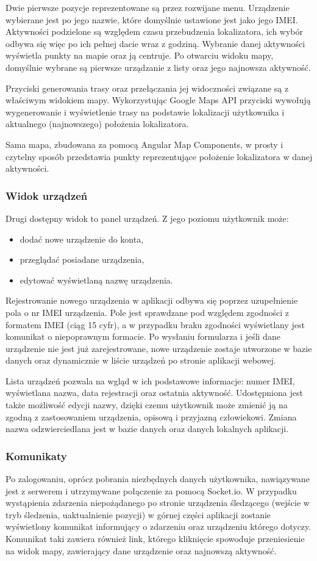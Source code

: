 \documentclass[eng,printmode]{mgr}
\begin{document}
Dwie pierwsze pozycje reprezentowane są przez rozwijane menu. Urządzenie wybierane jest po jego nazwie, które domyślnie ustawione jest jako jego IMEI. Aktywności podzielone są względem czasu przebudzenia lokalizatora, ich wybór odbywa się więc po ich pełnej dacie wraz z godziną. Wybranie danej aktywności wyświetla punkty na mapie oraz ją centruje. Po otwarciu widoku mapy, domyślnie wybrane są pierwsze urządzanie z listy oraz jego najnowsza aktywność.

Przyciski generowania trasy oraz przełączania jej widoczności związane są z właściwym widokiem mapy. Wykorzystując Google Maps API przyciski wywołują wygenerowanie i wyświetlenie trasy na podstawie lokalizacji użytkownika i aktualnego (najnowszego) położenia lokalizatora.

Sama mapa, zbudowana za pomocą Angular Map Components, w prosty i czytelny sposób przedstawia punkty reprezentujące położenie lokalizatora w danej aktywności.

\subsubsection{Widok urządzeń}
Drugi dostępny widok to panel urządzeń. Z jego poziomu użytkownik może:
\begin{itemize}
\item dodać nowe urządzenie do konta,
\item przeglądać posiadane urządzenia,
\item edytować wyświetlaną nazwę urządzenia.
\end{itemize}
Rejestrowanie nowego urządzenia w aplikacji odbywa się poprzez uzupełnienie pola o nr IMEI urządzenia. Pole jest sprawdzane pod względem zgodności z formatem IMEI (ciąg 15 cyfr), a w przypadku braku zgodności wyświetlany jest komunikat o niepoprawnym formacie. Po wysłaniu formularza i jeśli dane urządzenie nie jest już zarejestrowane, nowe urządzenie zostaje utworzone w bazie danych oraz dynamicznie w liście urządzeń po stronie aplikacji webowej.

Lista urządzeń pozwala na wgląd w ich podstawowe informacje: numer IMEI, wyświetlana nazwa, data rejestracji oraz ostatnia aktywność. Udostępniona jest także możliwość edycji nazwy, dzięki czemu użytkownik może zmienić ją na zgodną z zastosowaniem urządzenia, opisową i przyjazną człowiekowi. Zmiana nazwa odzwierciedlana jest w bazie danych oraz danych lokalnych aplikacji.

\subsubsection{Komunikaty}
Po zalogowaniu, oprócz pobrania niezbędnych danych użytkownika, nawiązywane jest z serwerem i utrzymywane połączenie za pomocą Socket.io. W przypadku wystąpienia zdarzenia niepożądanego po stronie urządzenia śledzącego (wejście w tryb śledzenia, uaktualnienie pozycji) w górnej części aplikacji zostanie wyświetlony komunikat informujący o zdarzeniu oraz urządzeniu którego dotyczy. Komunikat taki zawiera również link, którego kliknięcie spowoduje przeniesienie na widok mapy, zawierający dane urządzenie oraz najnowszą aktywność.
\end{document}

